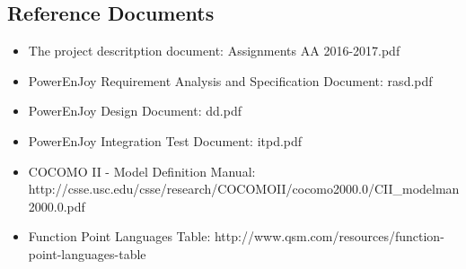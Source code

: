 \subsection{Reference Documents}
\begin{itemize}
	\item The project descritption document: Assignments AA 2016-2017.pdf
	\item PowerEnJoy Requirement Analysis and Specification Document: rasd.pdf
	\item PowerEnJoy Design Document: dd.pdf
	\item PowerEnJoy Integration Test Document: itpd.pdf
	\item COCOMO II - Model Definition Manual:\\ http://csse.usc.edu/csse/research/COCOMOII/cocomo2000.0/CII\_modelman2000.0.pdf
	\item Function Point Languages Table: http://www.qsm.com/resources/function-point-languages-table
\end{itemize}
	